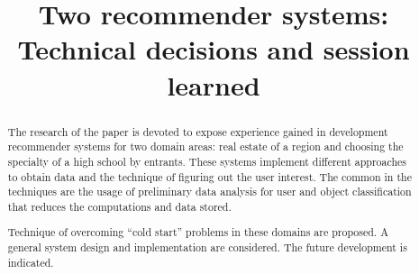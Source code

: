\documentclass[conference]{IEEEtran}
\begin{document}

\title{Two recommender systems: Technical decisions and session learned}

\author{%
}

\maketitle

\begin{abstract}
  The research of the paper is devoted to expose experience gained in development recommender systems for two domain areas: real estate of a region and choosing the specialty of a high school by entrants. These systems implement different approaches to obtain data and the technique of figuring out the user interest. The common in the techniques are the usage of preliminary data analysis for user and object classification that reduces the computations and data stored. %

Technique of overcoming ``cold start'' problems in these domains are proposed.  A general system design and implementation are considered.  The future development is indicated.

\end{abstract}
\end{document}
